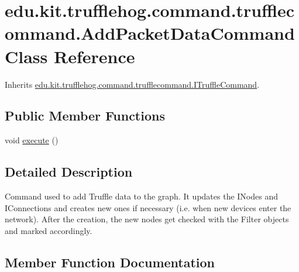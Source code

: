 \hypertarget{classedu_1_1kit_1_1trufflehog_1_1command_1_1trufflecommand_1_1_add_packet_data_command}{}\section{edu.\+kit.\+trufflehog.\+command.\+trufflecommand.\+Add\+Packet\+Data\+Command Class Reference}
\label{classedu_1_1kit_1_1trufflehog_1_1command_1_1trufflecommand_1_1_add_packet_data_command}


Inherits \hyperlink{interfaceedu_1_1kit_1_1trufflehog_1_1command_1_1trufflecommand_1_1_i_truffle_command}{edu.\+kit.\+trufflehog.\+command.\+trufflecommand.\+I\+Truffle\+Command}.

\subsection*{Public Member Functions}
\begin{DoxyCompactItemize}
\item 
void \hyperlink{classedu_1_1kit_1_1trufflehog_1_1command_1_1trufflecommand_1_1_add_packet_data_command_a4ed54d9757631b64e1c1907124b08ffa}{execute} ()
\end{DoxyCompactItemize}


\subsection{Detailed Description}
Command used to add Truffle data to the graph. It updates the I\+Nodes and I\+Connections and creates new ones if necessary (i.\+e. when new devices enter the network). After the creation, the new nodes get checked with the Filter objects and marked accordingly. 

\subsection{Member Function Documentation}
\hypertarget{classedu_1_1kit_1_1trufflehog_1_1command_1_1trufflecommand_1_1_add_packet_data_command_a4ed54d9757631b64e1c1907124b08ffa}{}
